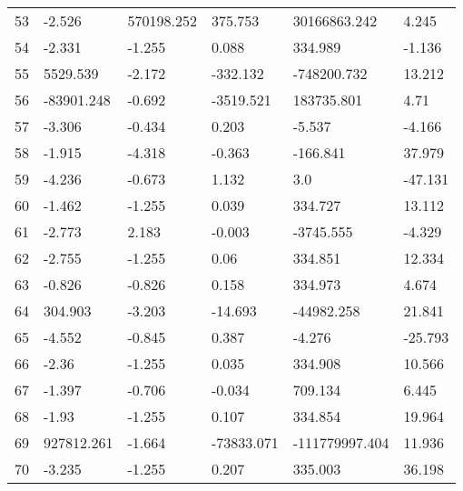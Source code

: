 \documentclass[11pt]{article}
\begin{document}
\begin{center}
\begin{longtable}{llllll}
        53  & -2.526     & 570198.252             & 375.753           & 30166863.242       & 4.245    \\
        54  & -2.331     & -1.255                 & 0.088             & 334.989            & -1.136   \\
        55  & 5529.539   & -2.172                 & -332.132          & -748200.732        & 13.212   \\
        56  & -83901.248 & -0.692                 & -3519.521         & 183735.801         & 4.71     \\
        57  & -3.306     & -0.434                 & 0.203             & -5.537             & -4.166   \\
        58  & -1.915     & -4.318                 & -0.363            & -166.841           & 37.979   \\
        59  & -4.236     & -0.673                 & 1.132             & 3.0                & -47.131  \\
        60  & -1.462     & -1.255                 & 0.039             & 334.727            & 13.112   \\
        61  & -2.773     & 2.183                  & -0.003            & -3745.555          & -4.329   \\
        62  & -2.755     & -1.255                 & 0.06              & 334.851            & 12.334   \\
        63  & -0.826     & -0.826                 & 0.158             & 334.973            & 4.674    \\
        64  & 304.903    & -3.203                 & -14.693           & -44982.258         & 21.841   \\
        65  & -4.552     & -0.845                 & 0.387             & -4.276             & -25.793  \\
        66  & -2.36      & -1.255                 & 0.035             & 334.908            & 10.566   \\
        67  & -1.397     & -0.706                 & -0.034            & 709.134            & 6.445    \\
        68  & -1.93      & -1.255                 & 0.107             & 334.854            & 19.964   \\
        69  & 927812.261 & -1.664                 & -73833.071        & -111779997.404     & 11.936   \\
        70  & -3.235     & -1.255                 & 0.207             & 335.003            & 36.198   \\

\end{longtable}
\end{center}
\end{document}
